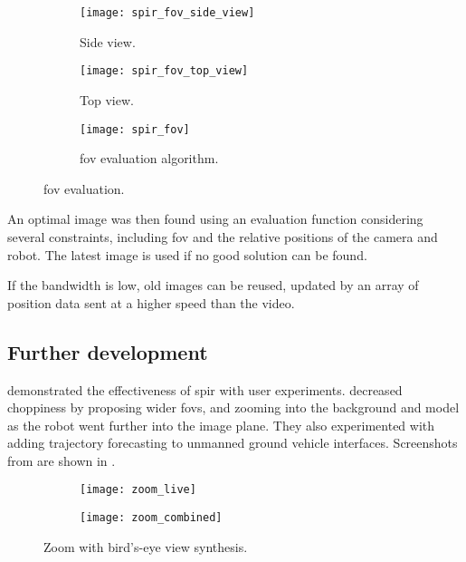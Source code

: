   \begin{figure}[h]
    \centering
    \begin{subfigure}[b]{0.3\textwidth}
      \texttt{[image: spir\_fov\_side\_view]}
      \caption{Side view.}
      \label{fig:spir_fov_side_view}
    \end{subfigure}
    \hfill
    \begin{subfigure}[b]{0.3\textwidth}
      \texttt{[image: spir\_fov\_top\_view]}
      \caption{Top view.}
      \label{fig:spir_fov_top_view}
    \end{subfigure}
    \hfill
    \begin{subfigure}[b]{0.3\textwidth}
      \texttt{[image: spir\_fov]}
      \caption{\Gls{fov} evaluation algorithm.}
      \label{fig:spir_fov_flowchart}
    \end{subfigure}
    \caption[SPIR FOV evaluation algorithm]{\Gls{fov} evaluation.\cite{shiroma2004}}
    \label{fig:spir_fov}
  \end{figure}

  An optimal image was then found using an evaluation function considering several constraints, including \gls{fov} and the relative positions of the camera and robot.
  The latest image is used if no good solution can be found.

  If the bandwidth is low, old images can be reused, updated by an array of position data sent at a higher speed than the video.

  \subsection{Further development}
    \textcite{sugimoto2005} demonstrated the effectiveness of \gls{spir} with user experiments.
    \textcite{ito2008} decreased choppiness by proposing wider \glspl{fov}, and zooming into the background and model as the robot went further into the image plane.
    They also experimented with adding trajectory forecasting to unmanned ground vehicle interfaces.
    Screenshots from \textcite{ito2008} are shown in .

    \begin{figure}[h]
      \centering
      \begin{subfigure}[b]{0.45\textwidth}
	\texttt{[image: zoom\_live]}
      \end{subfigure}
      \hfill
      \begin{subfigure}[b]{0.45\textwidth}
	\texttt{[image: zoom\_combined]}
      \end{subfigure}
      \caption[SPIR with zoom]{Zoom with bird's-eye view synthesis.\cite{ito2008}}
      \label{fig:zoom_results}
    \end{figure}

